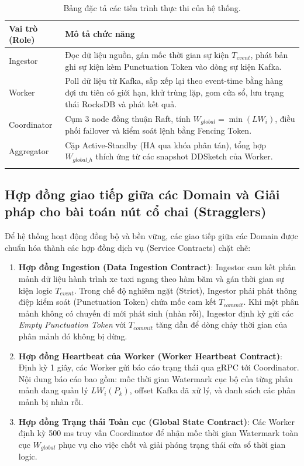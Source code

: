 \documentclass[12pt,a4paper]{article}
\begin{document}
\begin{longtable}{p{} p{}}
\toprule
\textbf{Vai trò (Role)} & \textbf{Mô tả chức năng} \\
\midrule
\endhead
Ingestor & Đọc dữ liệu nguồn, gán mốc thời gian sự kiện $T_{event}$, phát bản ghi sự kiện kèm Punctuation Token vào dòng sự kiện Kafka. \\
Worker & Poll dữ liệu từ Kafka, sắp xếp lại theo event-time bằng hàng đợi ưu tiên có giới hạn, khử trùng lặp, gom cửa sổ, lưu trạng thái RocksDB và phát kết quả. \\
Coordinator & Cụm 3 node đồng thuận Raft, tính $W_{global} = \min(LW_i)$, điều phối failover và kiểm soát lệnh bằng Fencing Token. \\
Aggregator & Cặp Active-Standby (HA qua khóa phân tán), tổng hợp $W_{global\_h}$ thích ứng từ các snapshot DDSketch của Worker. \\
\bottomrule
\caption{Bảng đặc tả các tiến trình thực thi của hệ thống.}
\end{longtable}

\subsection{Hợp đồng giao tiếp giữa các Domain và Giải pháp cho bài toán nút cổ chai (Stragglers)}

Để hệ thống hoạt động đồng bộ và bền vững, các giao tiếp giữa các Domain được chuẩn hóa thành các hợp đồng dịch vụ (Service Contracts) chặt chẽ:
\begin{enumerate}
    \item \textbf{Hợp đồng Ingestion (Data Ingestion Contract)}: Ingestor cam kết phân mảnh dữ liệu hành trình xe taxi ngang theo hàm băm và gán thời gian sự kiện logic $T_{event}$. Trong chế độ nghiêm ngặt (Strict), Ingestor phải phát thông điệp kiểm soát (Punctuation Token) chứa mốc cam kết $T_{commit}$. Khi một phân mảnh không có chuyến đi mới phát sinh (nhàn rỗi), Ingestor định kỳ gửi các \textit{Empty Punctuation Token} với $T_{commit}$ tăng dần để dòng chảy thời gian của phân mảnh đó không bị dừng.
    \item \textbf{Hợp đồng Heartbeat của Worker (Worker Heartbeat Contract)}: Định kỳ 1 giây, các Worker gửi báo cáo trạng thái qua gRPC tới Coordinator. Nội dung báo cáo bao gồm: mốc thời gian Watermark cục bộ của từng phân mảnh đang quản lý $LW_i(P_k)$, offset Kafka đã xử lý, và danh sách các phân mảnh bị nhàn rỗi.
    \item \textbf{Hợp đồng Trạng thái Toàn cục (Global State Contract)}: Các Worker định kỳ 500 ms truy vấn Coordinator để nhận mốc thời gian Watermark toàn cục $W_{global}$ phục vụ cho việc chốt và giải phóng trạng thái cửa sổ thời gian logic.
\end{enumerate}
\end{document}
